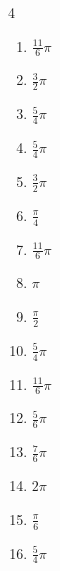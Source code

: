 \begin{multicols}{4}
\begin{enumerate}
  \item $\displaystyle \frac{11}{6}\pi$

  \item $\displaystyle \frac{3}{2}\pi$

  \item $\displaystyle \frac{5}{4}\pi$

  \item $\displaystyle \frac{5}{4}\pi$

  \item $\displaystyle \frac{3}{2}\pi$

  \item $\displaystyle \frac{\pi}{4}$

\columnbreak %

\resetques

  \item $\displaystyle \frac{11}{6}\pi$

  \item $\displaystyle \pi$

  \item $\displaystyle \frac{\pi}{2}$

  \item $\displaystyle \frac{5}{4}\pi$

  \item $\displaystyle \frac{11}{6}\pi$

  \item $\displaystyle \frac{5}{6}\pi$

  \item $\displaystyle \frac{7}{6}\pi$

  \item $\displaystyle 2\pi$

  \item $\displaystyle \frac{\pi}{6}$

  \item $\displaystyle \frac{5}{4}\pi$


\end{enumerate}
\end{multicols}
